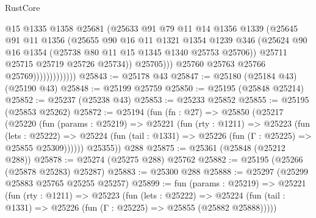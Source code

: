 \begin{lexlean}{RustCore}
\begin{coremodule}
                                  @15
                                  @1335
                                  @1358
                                  @25681
                                  (@25633
                                    @91
                                    @79
                                    @11
                                    @14
                                    @1356
                                    @1339
                                    (@25645
                                      @91
                                      @11
                                      @1356
                                      (@25655
                                        @90
                                        @16
                                        @11
                                        @1321
                                        @1354
                                        @1239
                                        @346
                                        (@25624
                                          @90
                                          @16
                                          @1354
                                          (@25738 @80 @11 @15 @1345 @1340 @25753 @25706))
                                        @25711
                                        @25715
                                        @25719
                                        @25726
                                        @25734))
                                    @25705)))
                              @25760
                              @25763
                              @25766
                              @25769)))))))))))))
@25843 := @25178 @43
@25847 := @25180 (@25184 @43) (@25190 @43)
@25848 := @25199 @25759
@25850 := @25195 (@25848 @25214)
@25852 := @25237 (@25238 @43)
@25853 := @25233 @25852
@25855 := @25195 (@25853 @25262)
@25872 := @25194
    (fun (fn : @27) =>
    @25850
      (@25217
        (@25220
          (fun (params : @25219) =>
          @25221
            (fun (rty : @1211) =>
            @25223
              (fun (lets : @25222) =>
              @25224 (fun (tail : @1331) => @25226 (fun (Γ : @25225) => @25855 @25309))))))
        @25355))
    @288
@25875 := @25361 (@25848 (@25212 @288))
@25878 := @25274 (@25275 @288) @25762
@25882 := @25195 (@25266 (@25878 @25283) @25287)
@25883 := @25300 @288
@25888 := @25297 (@25299 @25883 @25765 @25255 @25257)
@25899 := fun (params : @25219) =>
  @25221
    (fun (rty : @1211) =>
    @25223
      (fun (lets : @25222) =>
      @25224 (fun (tail : @1331) => @25226 (fun (Γ : @25225) => @25855 (@25882 @25888)))))

\end{coremodule}
\end{lexlean}
